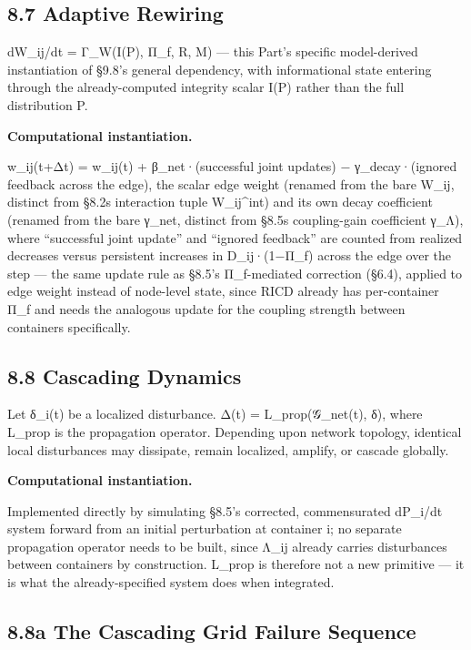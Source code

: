 \documentclass[
]{article}
\begin{document}
\hypertarget{adaptive-rewiring}{%
\subsection{8.7 Adaptive Rewiring}\label{adaptive-rewiring}}

dW\_ij/dt = Γ\_W(I(P), Π\_f, R, M) --- this Part's specific
model-derived instantiation of §9.8's general dependency, with
informational state entering through the already-computed integrity
scalar I(P) rather than the full distribution P.

\textbf{Computational instantiation.}

w\_ij(t+Δt) = w\_ij(t) + β\_net·(successful joint updates) −
γ\_decay·(ignored feedback across the edge), the scalar edge weight
(renamed from the bare W\_ij, distinct from §8.2\textquotesingle s
interaction tuple W\_ij\^{}int) and its own decay coefficient (renamed
from the bare γ\_net, distinct from §8.5\textquotesingle s coupling-gain
coefficient γ\_Λ), where ``successful joint update'' and ``ignored
feedback'' are counted from realized decreases versus persistent
increases in D\_ij·(1−Π\_f) across the edge over the step --- the same
update rule as §8.5's Π\_f-mediated correction (§6.4), applied to edge
weight instead of node-level state, since RICD already has per-container
Π\_f and needs the analogous update for the coupling strength between
containers specifically.

\hypertarget{cascading-dynamics}{%
\subsection{8.8 Cascading Dynamics}\label{cascading-dynamics}}

Let δ\_i(t) be a localized disturbance. Δ(t) = L\_prop(𝒢\_net(t), δ),
where L\_prop is the propagation operator. Depending upon network
topology, identical local disturbances may dissipate, remain localized,
amplify, or cascade globally.

\textbf{Computational instantiation.}

Implemented directly by simulating §8.5's corrected, commensurated
dP\_i/dt system forward from an initial perturbation at container i; no
separate propagation operator needs to be built, since Λ\_ij already
carries disturbances between containers by construction. L\_prop is
therefore not a new primitive --- it is what the already-specified
system does when integrated.

\hypertarget{a-the-cascading-grid-failure-sequence}{%
\subsection{8.8a The Cascading Grid Failure
Sequence}\label{a-the-cascading-grid-failure-sequence}}
\end{document}
